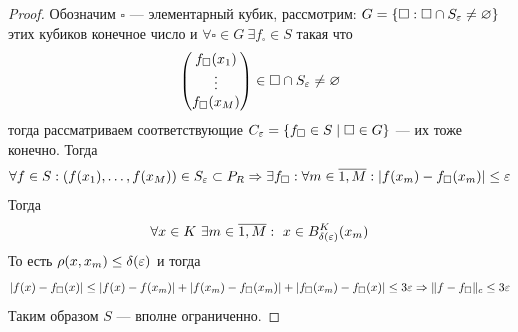 \begin{proof}
	Обозначим $\square$ --- элементарный кубик, рассмотрим: $G = \{\square : \square \cap S_\varepsilon \neq \varnothing \}$ этих кубиков конечное число и $\forall \square \in G \ \exists f_\square \in S$ такая что 
	$$
	\begin{pmatrix}
		f_\square(x_1) \\
		\vdots \\
		f_\square(x_M)
	\end{pmatrix} \in \square \cap S_\varepsilon \neq \varnothing
	$$  тогда рассматриваем соответствующие $C_\varepsilon = \{f_\square \in S \mid \square \in G\}$ --- их тоже конечно. Тогда
	$$
	\forall f \in S: (f(x_1), \dots, f(x_M)) \in S_\varepsilon \subset P_R \Rightarrow \exists f_\square: \forall m \in \overline{1, M}: |f(x_m) - f_\square(x_m)| \leq \varepsilon
	$$
	Тогда 
	$$\forall x \in K 	\ \exists m \in \overline{1, M}: \ x \in B_{\delta(\varepsilon)}^K(x_m)$$
	То есть $\rho(x,x_m) \leq \delta(\varepsilon)$ и тогда
	$$
	|f(x) - f_\square(x)| \leq |f(x) - f(x_m)| + |f(x_m) - f_\square(x_m)| + |f_\square(x_m) - f_\square(x)| \leq 3\varepsilon \Rightarrow \|f - f_\square\|_c \leq 3\varepsilon
	$$
	Таким образом $S$ --- вполне ограниченно. 
\end{proof}
